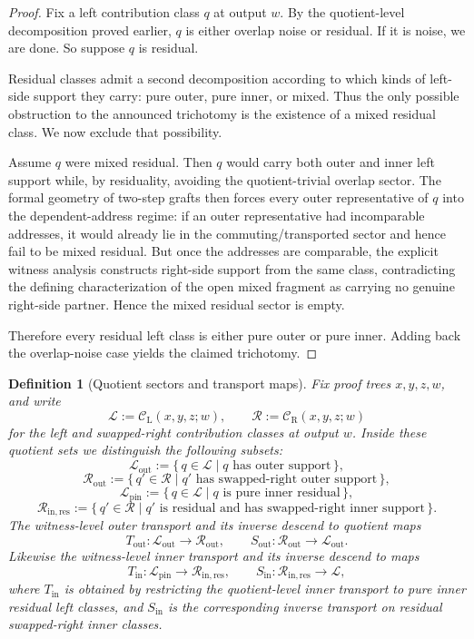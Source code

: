\documentclass[11pt]{article}
\newtheorem{definition}[theorem]{Definition}
\newcommand{\CL}{\mathcal{C}_{\mathrm{L}}}
\newcommand{\CR}{\mathcal{C}_{\mathrm{R}}}
\begin{document}
\begin{proof}
Fix a left contribution class \(q\) at output \(w\). By the quotient-level
decomposition proved earlier, \(q\) is either overlap noise or residual. If it
is noise, we are done. So suppose \(q\) is residual.

Residual classes admit a second decomposition according to which kinds of
left-side support they carry: pure outer, pure inner, or mixed. Thus the only
possible obstruction to the announced trichotomy is the existence of a mixed
residual class. We now exclude that possibility.

Assume \(q\) were mixed residual. Then \(q\) would carry both outer and inner
left support while, by residuality, avoiding the quotient-trivial overlap
sector. The formal geometry of two-step grafts then forces every outer
representative of \(q\) into the dependent-address regime: if an outer
representative had incomparable addresses, it would already lie in the
commuting/transported sector and hence fail to be mixed residual. But once the
addresses are comparable, the explicit witness analysis constructs right-side
support from the same class, contradicting the defining characterization of the
open mixed fragment as carrying no genuine right-side partner. Hence the mixed
residual sector is empty.

Therefore every residual left class is either pure outer or pure inner. Adding
back the overlap-noise case yields the claimed trichotomy.
\end{proof}

\begin{definition}[Quotient sectors and transport maps]
Fix proof trees \(x,y,z,w\), and write
\[
\mathcal L:=\CL(x,y,z;w),
\qquad
\mathcal R:=\CR(x,y,z;w)
\]
for the left and swapped-right contribution classes at output \(w\).  Inside
these quotient sets we distinguish the following subsets:
\[
\mathcal L_{\mathrm{out}}
:=
\{\,q\in \mathcal L \mid \text{$q$ has outer support}\,\},
\]
\[
\mathcal R_{\mathrm{out}}
:=
\{\,q'\in \mathcal R \mid \text{$q'$ has swapped-right outer support}\,\},
\]
\[
\mathcal L_{\mathrm{pin}}
:=
\{\,q\in \mathcal L \mid \text{$q$ is pure inner residual}\,\},
\]
\[
\mathcal R_{\mathrm{in,res}}
:=
\{\,q'\in \mathcal R \mid \text{$q'$ is residual and has swapped-right inner support}\,\}.
\]
The witness-level outer transport and its inverse descend to quotient maps
\[
T_{\mathrm{out}}:\mathcal L_{\mathrm{out}}\to \mathcal R_{\mathrm{out}},
\qquad
S_{\mathrm{out}}:\mathcal R_{\mathrm{out}}\to \mathcal L_{\mathrm{out}}.
\]
Likewise the witness-level inner transport and its inverse descend to maps
\[
T_{\mathrm{in}}:\mathcal L_{\mathrm{pin}}\to \mathcal R_{\mathrm{in,res}},
\qquad
S_{\mathrm{in}}:\mathcal R_{\mathrm{in,res}}\to \mathcal L,
\]
where \(T_{\mathrm{in}}\) is obtained by restricting the quotient-level inner
transport to pure inner residual left classes, and \(S_{\mathrm{in}}\) is the
corresponding inverse transport on residual swapped-right inner classes.
\end{definition}
\end{document}
